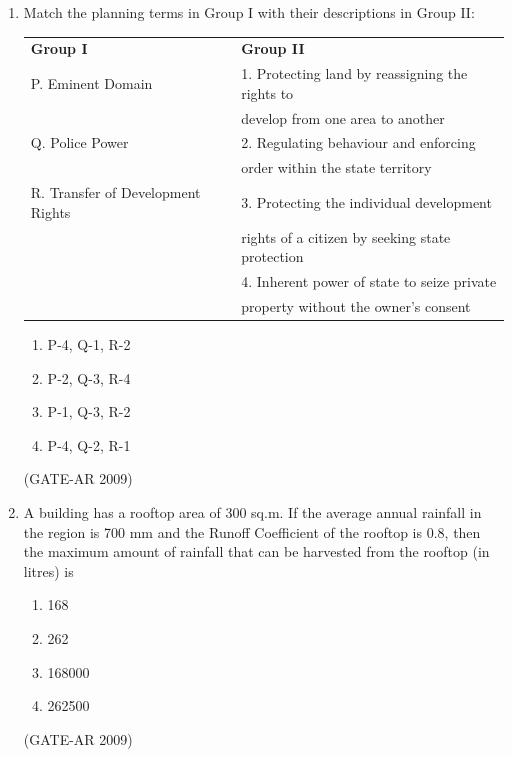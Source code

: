 \documentclass[a4paper,10pt]{article}
\begin{document}
\begin{enumerate}
    \item Match the planning terms in Group I with their descriptions in Group II:  \\
    \begin{tabular}{ l l }
	\textbf{Group I} & \textbf{Group II} \\
	P. Eminent Domain & 1. Protecting land by reassigning the rights to \\
	    & develop from one area to another \\
	Q. Police Power & 2. Regulating behaviour and enforcing \\
	    & order within the state territory \\
	R. Transfer of Development Rights & 3. Protecting the individual development \\
	    & rights of a citizen by seeking state protection \\
	& 4. Inherent power of state to seize private \\
	    & property without the owner’s consent \\
	\end{tabular}
	\begin{multicols}{2}
	\begin{enumerate}
        \item P-4, Q-1, R-2
        \item P-2, Q-3, R-4
        \item P-1, Q-3, R-2
        \item P-4, Q-2, R-1
    \end{enumerate}
	\end{multicols}
    \hfill (GATE-AR 2009)

    \item A building has a rooftop area of 300 sq.m. If the average annual rainfall in the region is 700 mm and the Runoff Coefficient of the rooftop is 0.8, then the maximum amount of rainfall that can be harvested from the rooftop (in litres) is 
    \begin{multicols}{2}
	\begin{enumerate}
        \item 168
        \item 262
        \item 168000
        \item 262500
    \end{enumerate}
	\end{multicols}
    \hfill (GATE-AR 2009)


\end{enumerate}
\end{document}
